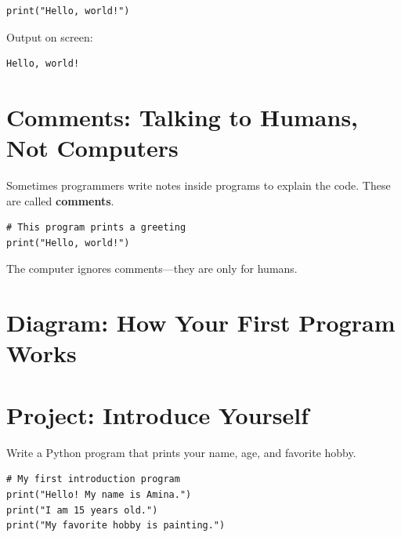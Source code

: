 \begin{verbatim}
print("Hello, world!")
\end{verbatim}

Output on screen:

\begin{verbatim}
Hello, world!
\end{verbatim}

\section{Comments: Talking to Humans, Not Computers}

Sometimes programmers write notes inside programs to explain the code.  
These are called \textbf{comments}.

\begin{verbatim}
# This program prints a greeting
print("Hello, world!")
\end{verbatim}

The computer ignores comments—they are only for humans.

\section{Diagram: How Your First Program Works}

\begin{center}
\end{center}

\section{Project: Introduce Yourself}

Write a Python program that prints your name, age, and favorite hobby.  

\begin{verbatim}
# My first introduction program
print("Hello! My name is Amina.")
print("I am 15 years old.")
print("My favorite hobby is painting.")
\end{verbatim}

